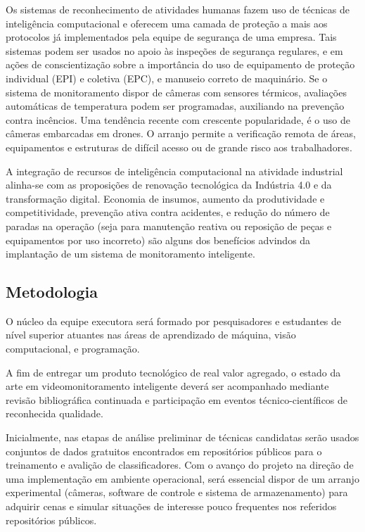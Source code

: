 Os sistemas de reconhecimento de atividades humanas fazem uso de técnicas de inteligência computacional e oferecem uma camada de proteção a mais aos protocolos já implementados pela equipe de segurança de uma empresa. Tais sistemas podem ser usados no apoio às inspeções de segurança regulares, e em ações de conscientização sobre a importância do uso de equipamento de proteção individual (EPI) e coletiva (EPC), e manuseio correto de maquinário. Se o sistema de monitoramento dispor de câmeras com sensores térmicos, avaliações automáticas de temperatura podem ser programadas, auxiliando na prevenção contra incêncios. Uma tendência recente com crescente popularidade, é o uso de câmeras embarcadas em drones. O arranjo permite a verificação remota de áreas, equipamentos e estruturas de difícil acesso ou de grande risco aos trabalhadores.

A integração de recursos de inteligência computacional na atividade industrial alinha-se com as proposições de renovação tecnológica da Indústria 4.0 e da transformação digital. Economia de insumos, aumento da produtividade e competitividade, prevenção ativa contra acidentes, e redução do número de paradas na operação (seja para manutenção reativa ou reposição de peças e equipamentos por uso incorreto) são alguns dos benefícios advindos da implantação de um sistema de monitoramento inteligente. 

\subsection{Metodologia}
\label{ssec:metod}

O núcleo da equipe executora será formado por pesquisadores e estudantes de nível superior atuantes nas áreas de aprendizado de máquina, visão computacional, e programação.

A fim de entregar um produto tecnológico de real valor agregado, o estado da arte em videomonitoramento inteligente deverá ser acompanhado mediante revisão bibliográfica continuada e participação em eventos técnico-científicos de reconhecida qualidade.

Inicialmente, nas etapas de análise preliminar de técnicas candidatas serão usados conjuntos de dados gratuitos encontrados em repositórios públicos para o treinamento e avalição de classificadores. Com o avanço do projeto na direção de uma implementação em ambiente operacional, será essencial dispor de um arranjo experimental (câmeras, software de controle e sistema de armazenamento) para adquirir cenas e simular situações de interesse pouco frequentes nos referidos repositórios públicos.


